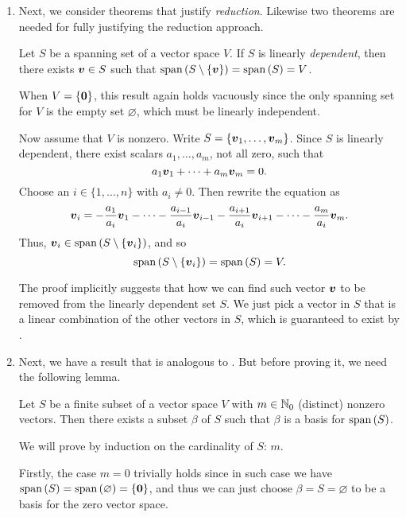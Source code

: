 \begin{enumerate}
\item Next, we consider theorems that justify \emph{reduction}. Likewise two
theorems are needed for fully justifying the reduction approach.

\begin{theorem}
\label{thm:remove-vec-still-spn}
Let \(S\) be a spanning set of a vector space \(V\). If \(S\) is linearly
\emph{dependent}, then there exists \(\vb*{v}\in S\) such that
\(\operatorname{span}\qty(S\setminus \{\vb*{v}\})=\operatorname{span}\qty(S)=V\).
\end{theorem}
\begin{pf}
When \(V=\{\vb*{0}\}\), this result again holds vacuously since the only
spanning set for \(V\) is the empty set \(\varnothing\), which must be linearly
independent.

Now assume that \(V\) is nonzero. Write \(S=\{\vb*{v}_1,\dotsc,\vb*{v}_m\}\).
Since \(S\) is linearly dependent, there exist scalars \(a_1,\dotsc,a_m\), not
all zero, such that
\[
a_1\vb*{v}_1+\dotsb+a_m\vb*{v}_m=0.
\]
Choose an \(i\in\{1,\dotsc,n\}\) with \(a_i\ne 0\). Then rewrite the equation as
\[
\vb*{v}_i=-\frac{a_1}{a_i}\vb*{v}_1-\dotsb-\frac{a_{i-1}}{a_i}\vb*{v}_{i-1}
-\frac{a_{i+1}}{a_i}\vb*{v}_{i+1}-\dotsb-\frac{a_m}{a_i}\vb*{v}_m.
\]
Thus, \(\vb*{v}_i\in\operatorname{span}\qty(S\setminus \{\vb*{v}_i\})\), and so
\[
\operatorname{span}\qty(S\setminus \{\vb*{v}_i\})=\operatorname{span}\qty(S)=V.
\]
\end{pf}

\begin{note}
The proof implicitly suggests that how we can find such vector \(\vb*{v}\) to
be removed from the linearly dependent set \(S\). We just pick a vector in
\(S\) that is a linear combination of the other vectors in \(S\), which is
guaranteed to exist by .
\end{note}
\item Next, we have a result that is analogous to .
But before proving it, we need the following lemma.
\begin{lemma}
\label{lma:basis-subset}
Let \(S\) be a finite subset of a vector space \(V\) with \(m\in\mathbb{N}_0\)
(distinct) nonzero vectors.  Then there exists a subset \(\beta\) of \(S\) such
that \(\beta\) is a basis for \(\operatorname{span}\qty(S)\).
\end{lemma}
\begin{pf}
We will prove by induction on the cardinality of \(S\): \(m\).

Firstly, the case \(m=0\) trivially holds since in such case we have
\(\operatorname{span}\qty(S)=\operatorname{span}\qty(\varnothing)=\{\vb*{0}\}\), and thus we can just choose
\(\beta=S=\varnothing\) to be a basis for the zero vector space.


\end{pf}
\end{enumerate}
